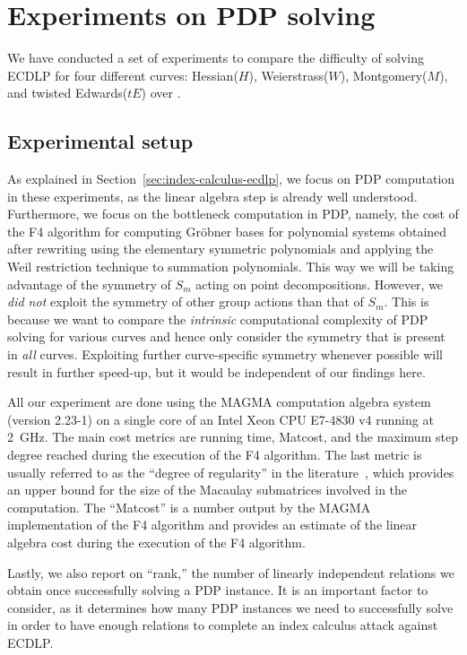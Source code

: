 \section{Experiments on PDP solving}
\label{sec:experiment}

We have conducted a set of experiments to compare the difficulty of
solving ECDLP for four different curves: Hessian($H$), Weierstrass($W$),
Montgomery($M$), and twisted Edwards($tE$) over .
%

\subsection{Experimental setup}
\label{subsec:conditions}



As explained in Section~\ref{sec:index-calculus-ecdlp}, we focus on
PDP computation in these experiments, as the linear algebra step is
already well understood.
%
Furthermore, we focus on the bottleneck computation in PDP, namely,
the cost of the F4 algorithm for computing Gr\"obner bases for
polynomial systems obtained after rewriting using the elementary
symmetric polynomials and applying the Weil restriction technique to
summation polynomials.
%
This way we will be taking advantage of the symmetry of $S_m$ acting
on point decompositions.
% 
However, we \emph{did not} exploit the symmetry of other group actions
than that of $S_m$.
%
This is because we want to compare the \emph{intrinsic} computational
complexity of PDP solving for various curves and hence only consider
the symmetry that is present in \emph{all} curves.
%
Exploiting further curve-specific symmetry whenever possible will
result in further speed-up, but it would be independent of our
findings here.

All our experiment are done using the MAGMA computation algebra system
(version 2.23-1) on a single core of an Intel Xeon CPU E7-4830 v4
running at 2~GHz.
%
The main cost metrics are running time, Matcost, and the maximum step
degree reached during the execution of the F4 algorithm.
%
The last metric is usually referred to as the ``degree of regularity''
in the literature~\cite{DBLP:conf/indocrypt/GalbraithG14}, which
provides an upper bound for the size of the Macaulay submatrices
involved in the computation.
%
The ``Matcost'' is a number output by the MAGMA implementation of the
F4 algorithm and provides an estimate of the linear algebra cost
during the execution of the F4 algorithm.

Lastly, we also report on ``rank,'' the number of linearly independent
relations we obtain once successfully solving a PDP instance.
%
It is an important factor to consider, as it determines how many PDP
instances we need to successfully solve in order to have enough
relations to complete an index calculus attack against ECDLP.

